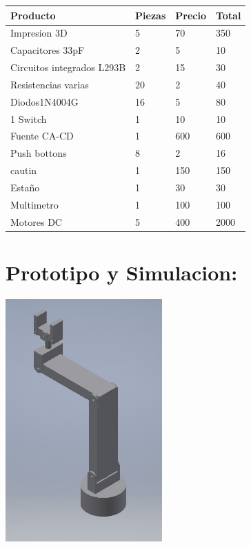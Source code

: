\documentclass[14pt,a4paper]{article}
\begin{document}
\begin{tabular}{|l|l|l|l|}
\hline
	Producto & Piezas & Precio & Total\\
\hline
	Impresion 3D & 5 & 70 & 350\\

\hline
	Capacitores 33pF & 2 & 5 & 10\\
\hline
	 Circuitos integrados L293B & 2 & 15 & 30\\
\hline
	Resistencias varias & 20 & 2 & 40\\
\hline
	Diodos1N4004G & 16 & 5 & 80\\
\hline
	1 Switch & 1 & 10 & 10\\

\hline
	Fuente CA-CD & 1 & 600 & 600\\
\hline
	Push bottons & 8 & 2 & 16\\
\hline
cautin & 1 & 150 & 150\\
\hline
	Estaño & 1 & 30 & 30\\
\hline
	Multimetro & 1 & 100 & 100\\
\hline
Motores DC & 5 & 400 & 2000\\
\hline
\end{tabular}

\section{Prototipo y Simulacion:}
\begin{center}
\includegraphics[width=6cm]{Proto.jpeg}
\end{center}
\end{document}
